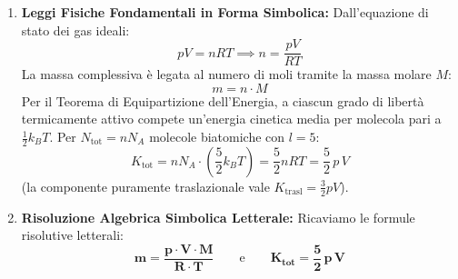 \documentclass[11pt,a4paper,oneside]{report}
\begin{document}
\begin{problema}
\begin{enumerate}[label=\textbf{Fase \arabic*:}, leftmargin=*, itemsep=5pt]
\begin{center}
  \par{}
  \end{center}

  \item \textbf{Leggi Fisiche Fondamentali in Forma Simbolica:}
  Dall'equazione di stato dei gas ideali:
  \[
  p V = n R T \implies n = \frac{p V}{R T}
  \]
  La massa complessiva \`e legata al numero di moli tramite la massa molare $M$:
  \[
  m = n \cdot M
  \]
  Per il Teorema di Equipartizione dell'Energia, a ciascun grado di libert\`a termicamente attivo compete un'energia cinetica media per molecola pari a $\frac{1}{2} k_B T$. Per $N_{\text{tot}} = n N_A$ molecole biatomiche con $l = 5$:
  \[
  K_{\text{tot}} = n N_A \cdot \left(\frac{5}{2} k_B T\right) = \frac{5}{2} n R T = \frac{5}{2} \, p \, V
  \]
  (la componente puramente traslazionale vale $K_{\text{trasl}} = \frac{3}{2} p V$).

  \item \textbf{Risoluzione Algebrica Simbolica Letterale:}
  Ricaviamo le formule risolutive letterali:
  \[
  \mathbf{m = \frac{p \cdot V \cdot M}{R \cdot T}} \qquad \text{e} \qquad \mathbf{K_{\text{tot}} = \frac{5}{2} \, p \, V}
  \]


\end{enumerate}
\end{problema}
\end{document}
